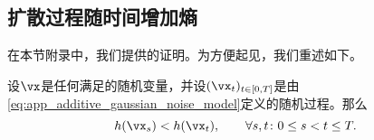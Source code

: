 \documentclass[../../book-main_zh.tex]{subfiles}
\begin{document}
\subsection{扩散过程随时间增加熵}\label{sub:diffusion_entropy_increases}

在本节附录中，我们提供的证明。为方便起见，我们重述如下。

\begin{theorem}[扩散增加熵]\label{thm:diffusion_entropy_increases}
    设\(\vx\)是任何满足的随机变量，并设\((\vx_{t})_{t \in [0, T]}\)是由\eqref{eq:app_additive_gaussian_noise_model}定义的随机过程。那么
    \begin{equation}\label{eq:diffusion_entropy_increases}
        h(\vx_{s}) < h(\vx_{t}), \qquad \forall s, t \colon 0 \leq s < t \leq T.
    \end{equation}
\end{theorem}
\end{document}
